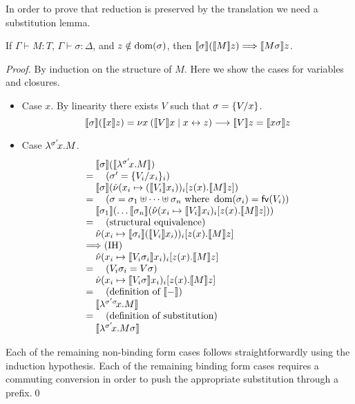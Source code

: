 \documentclass[orivec,envcountsame]{llncs}
\begin{document}

In order to prove that reduction is preserved by the translation we need a substitution lemma.
\begin{lemma}
\label{lem:tocp-subst}
If $\Gamma \vdash M : T$, $\Gamma \vdash \sigma : \Delta$, and $z \notin \dom(\sigma)$, then
$\tocp{\sigma}(\tocp{M}z) \bigrto \tocp{M \sigma}z$.
\end{lemma}
\begin{proof}
By induction on the structure of $M$. Here we show the cases for variables and closures.
\begin{itemize}
\item Case $x$. By linearity there exists $V$ such that $\sigma = \{\bind{x}{V}\}$.
\[
\tocp{\sigma}(\tocp{x}z) =
\cut{x}{}{\tocp{V}x}{\link{x}{z}} \rto \tocp{V}z = \tocp{x \sigma}z
\]
\item Case $\clos{\sigma'}{x}{M}$.
\[
\bl
\quad \tocp{\sigma}(\tocp{\clos{\sigma'}{x}{M}}) \\
= \quad (\sigma' = \{\bind{x_i}{V_i}\}_i) \\
\quad \tocp{\sigma}(\hat{\nu} (x_i \mapsto (\tocp{V_i}x_i))_i[z(x).\tocp{M}z]) \\
= \quad (\sigma = \sigma_1 \uplus \dots \uplus \sigma_n \text{ where } \dom(\sigma_i) = \fv(V_i)) \\
\quad \tocp{\sigma_1}(\dots\tocp{\sigma_n} (\hat{\nu} (x_i \mapsto \tocp{V_i}x_i)_i[z(x).\tocp{M}z])) \\
= \quad (\text{structural equivalence}) \\
\quad \hat{\nu} (x_i \mapsto \tocp{\sigma_i}(\tocp{V_i}x_i))_i[z(x).\tocp{M}z] \\
\bigrto (\text{IH}) \\
\quad \hat{\nu} (x_i \mapsto \tocp{V_i \sigma_i}x_i)_i[z(x).\tocp{M}z] \\
= \quad (V_i \sigma_i = V \sigma) \\
\quad \hat{\nu} (x_i \mapsto \tocp{V_i \sigma}x_i)_i[z(x).\tocp{M}z] \\
= \quad (\text{definition of }\tocp{-}) \\
\quad \tocp{\clos{\sigma' \sigma}{x}{M}} \\
= \quad (\text{definition of substitution}) \\
\quad \tocp{\clos{\sigma'}{x}{M} \sigma} \\
\el
\]
\end{itemize}
Each of the remaining non-binding form cases follows straightforwardly using the induction
hypothesis. Each of the remaining binding form cases requires a commuting conversion in order to
push the appropriate substitution through a prefix.\qed
\end{proof}
\end{document}
